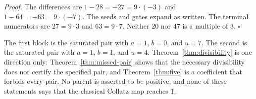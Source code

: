 \documentclass[11pt,letterpaper]{article}
\newenvironment{proof}{\noindent\textit{Proof.}}{\hfill\(\square\)}
\begin{document}
\begin{proof}
The differences are \(1-28=-27=9\cdot(-3)\) and \(1-64=-63=9\cdot(-7)\). The seeds and gates expand as written. The terminal numerators are \(27=9\cdot 3\) and \(63=9\cdot 7\). Neither \(20\) nor \(47\) is a multiple of \(3\).
\end{proof}

The first block is the saturated pair with \(a=1\), \(b=0\), and \(u=7\). The second is the saturated pair with \(a=1\), \(b=1\), and \(u=4\). Theorem~\ref{thm:divisibility} is one direction only: Theorem~\ref{thm:missed-pair} shows that the necessary divisibility does not certify the specified pair, and Theorem~\ref{thm:five} is a coefficient that forbids every pair. No parent is asserted to be positive, and none of these statements says that the classical Collatz map reaches \(1\).
\end{document}
